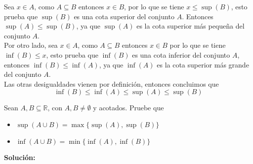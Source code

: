 \documentclass[12pt]{book}
\begin{document}
Sea $x \in A$, como $A \subseteq B$ entonces $x \in B$, por lo que se tiene  $x\leq \sup(B)$, esto prueba que $\sup(B)$ es una cota superior del conjunto $A$. Entonces $\sup(A) \leq \sup(B)$, ya que $\sup(A)$ es la cota superior más pequeña del conjunto $A$. \\


    Por otro lado, sea $x \in A$, como $A \subseteq B$ entonces $x\in B$ por lo que se tiene $\inf(B) \leq x$, esto prueba que $\inf(B)$ es una cota inferior del conjunto $A$, entonces $\inf(B)\leq\inf(A)$, ya que $\inf(A)$ es la cota superior más grande del conjunto $A$. \\

    Las otras desigualdades vienen por definición, entonces concluimos que 
    \begin{equation*}
         \inf(B)\leq \inf(A)\leq \sup(A)\leq \sup(B)
    \end{equation*}


\begin{prob}{}{}
    Sean $A,B \subseteq \mathbb{R}$, con $A,B\neq \emptyset$ y acotados. Pruebe que 
\begin{itemize}
    \item[\textbf{a)}] $\sup(A\cup B)= \max\{\sup(A),\sup(B)\}$
    \item[\textbf{b)}] $\inf(A \cup B)=\min\{\inf(A),\inf(B)\}$
\end{itemize}
\end{prob}
\textbf{Solución:}
\end{document}
